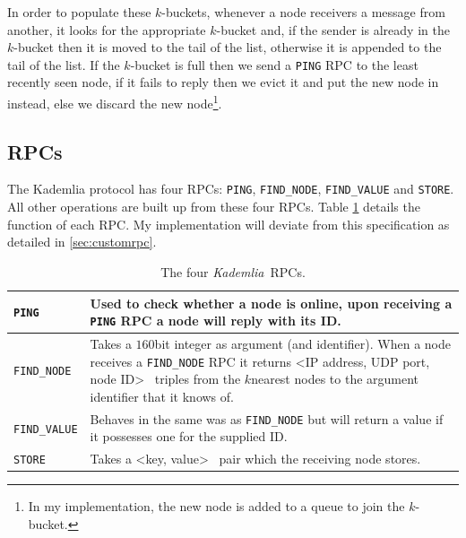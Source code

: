 \documentclass[12pt,notitlepage,a4paper]{report}
\newcommand{\kademlia}{\emph{Kademlia}}
\newcommand{\K}{$k$}
\begin{document}
	In order to populate these \K-buckets, whenever a node receivers a message from another, it looks for the appropriate \K-bucket and, if the sender is already in the \K-bucket then it is moved to the tail of the list, otherwise it is appended to the tail of the list. If the \K-bucket is full then we send a \texttt{PING} RPC to the least recently seen node, if it fails to reply then we evict it and put the new node in instead, else we discard the new node\footnote{In my implementation, the new node is added to a queue to join the \K-bucket.}.
	
	\subsection{RPCs}
	The Kademlia protocol has four RPCs: \texttt{PING}, \texttt{FIND\_NODE}, \texttt{FIND\_VALUE} and \texttt{STORE}. All other operations are built up from these four RPCs. Table \ref{tab:rpcs} details the function of each RPC. My implementation will deviate from this specification as detailed in \cref{sec:customrpc}.
	
	\begin{table}
		\begin{tabularx}{\textwidth}{| l | X |}
			\hline
			\texttt{PING} & Used to check whether a node is online, upon receiving a \texttt{PING} RPC a node will reply with its ID.\\
			\hline
			\texttt{FIND\_NODE} & Takes a $160$bit integer as argument (and identifier). When a node receives a \texttt{FIND\_NODE} RPC it returns \textless IP address, UDP port, node ID\textgreater~ triples from the \K nearest nodes to the argument identifier that it knows of.\\
			\hline
			\texttt{FIND\_VALUE} & Behaves in the same was as \texttt{FIND\_NODE} but will return a value if it possesses one for the supplied ID.\\
			\hline
			\texttt{STORE} & Takes a \textless key, value\textgreater~ pair which the receiving node stores.\\
			\hline
		\end{tabularx}
		\caption{The four \kademlia~RPCs.}
		\label{tab:rpcs}
	\end{table}
	
\end{document}
